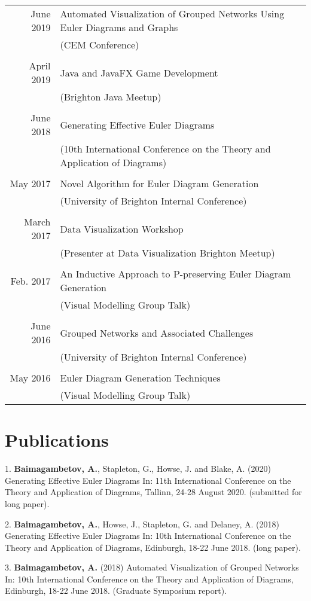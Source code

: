 \documentclass[a4paper,11pt]{article} %
\begin{document}
\begin{center}
\begin{tabular}{rl}
June 2019 & Automated Visualization of Grouped Networks Using Euler Diagrams and Graphs\\ & (CEM Conference) \\
\\
April 2019 & Java and JavaFX Game Development\\ & (Brighton Java Meetup) \\
\\
June 2018 & Generating Effective Euler Diagrams\\ & (10th International Conference on the Theory and Application of Diagrams) \\
\\
May 2017 & Novel Algorithm for Euler Diagram Generation\\ & (University of Brighton Internal Conference) \\
\\
March 2017 & Data Visualization Workshop\\ & (Presenter at Data Visualization Brighton Meetup) \\
\\
Feb. 2017 & An Inductive Approach to P-preserving Euler Diagram Generation\\ & (Visual Modelling Group Talk) \\
\\
June 2016 & Grouped Networks and Associated Challenges\\ & (University of Brighton Internal Conference) \\
\\
May 2016 & Euler Diagram Generation Techniques\\ & (Visual Modelling Group Talk) \\
\end{tabular}
\end{center}



\section{Publications}

1. \textbf{Baimagambetov, A.}, Stapleton, G., Howse, J. and Blake, A. (2020)
Generating Effective Euler Diagrams In:
11th International Conference on the Theory and Application of Diagrams, Tallinn, 24-28 August 2020.
(submitted for long paper).

2. \textbf{Baimagambetov, A.}, Howse, J., Stapleton, G. and Delaney, A. (2018)
Generating Effective Euler Diagrams In:
10th International Conference on the Theory and Application of Diagrams, Edinburgh, 18-22 June 2018.
(long paper).

3. \textbf{Baimagambetov, A.} (2018)
Automated Visualization of Grouped Networks In:
10th International Conference on the Theory and Application of Diagrams, Edinburgh, 18-22 June 2018.
(Graduate Symposium report).
\end{document}
